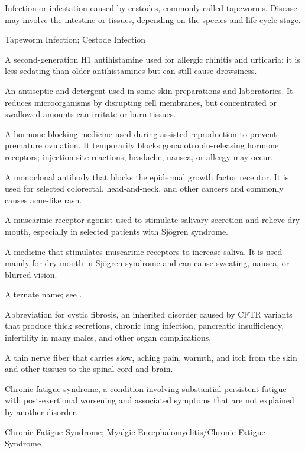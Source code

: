 Infection or infestation caused by cestodes, commonly called tapeworms. Disease may
involve the intestine or tissues, depending on the species and life-cycle stage.

\synonyms
Tapeworm Infection; Cestode Infection

 A second-generation H1 antihistamine used for allergic rhinitis and urticaria; it is less sedating than older antihistamines but can still cause drowsiness.

 An antiseptic and detergent used in some skin preparations and laboratories. It reduces microorganisms by disrupting cell membranes, but concentrated or swallowed amounts can irritate or burn tissues.

 A hormone-blocking medicine used during assisted reproduction to prevent premature ovulation. It temporarily blocks gonadotropin-releasing hormone receptors; injection-site reactions, headache, nausea, or allergy may occur.

 A monoclonal antibody that blocks the epidermal growth factor receptor. It is used for selected colorectal, head-and-neck, and other cancers and commonly causes acne-like rash.

 A muscarinic receptor agonist used to stimulate salivary secretion and relieve dry mouth, especially in selected patients with Sjögren syndrome.

 A medicine that stimulates muscarinic receptors to increase saliva. It is used mainly for dry mouth in Sjögren syndrome and can cause sweating, nausea, or blurred vision.

 Alternate name; see .

 Abbreviation for cystic fibrosis, an inherited disorder caused by CFTR variants that produce thick secretions, chronic lung infection, pancreatic insufficiency, infertility in many males, and other organ complications.

 A thin nerve fiber that carries slow, aching pain, warmth, and itch from the skin and other tissues to the spinal cord and brain.

 Chronic fatigue syndrome, a condition involving substantial persistent fatigue with post-exertional worsening and associated symptoms that are not explained by another disorder.

\synonyms
Chronic Fatigue Syndrome; Myalgic Encephalomyelitis/Chronic Fatigue Syndrome

